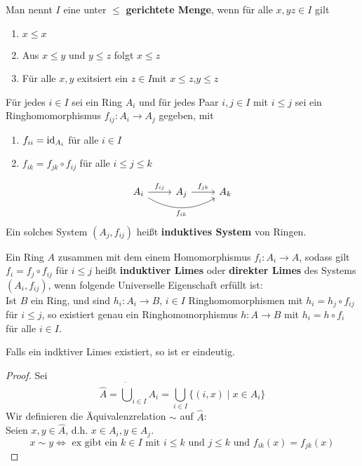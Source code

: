 	\begin{definition}
		Man nennt $I$ eine unter $\leq$ \textbf{gerichtete Menge}, wenn für alle $x,yz\in I$ gilt
		\begin{enumerate}
			\item $x\leq x$
			\item Aus $x\leq y$ und $y\leq z$ folgt $x\leq z$
			\item Für alle $x,y$ exitsiert ein $z\in I$mit $x\leq z$,$y\leq z$
		\end{enumerate}
	\end{definition}

	\begin{definition}
		Für jedes $i\in I$ sei ein Ring $A_i$ und für jedes Paar $i,j\in I$ mit $i\leq j$ sei ein Ringhomomorphismus $f_{ij}:A_i\to A_j$ gegeben, mit
		\begin{enumerate}
			\item $f_{ii}=\operatorname{id}_{A_i}$ für alle $i\in I$
			\item $f_{ik}=f_{jk}\circ f_{ij}$ für alle $i\leq j\leq k$
		\end{enumerate}
		\[\begin{tikzcd}
			A_i\ar[r,"f_{ij}"] \ar[rr,"f_{ik}"',bend right] &A_j\ar[r,"f_{jk}"]&A_k
		\end{tikzcd}\]
		Ein solches System $(A_j,f_{ij})$ heißt \textbf{induktives System} von Ringen.
	\end{definition}

	\begin{definition}
		Ein Ring $A$ zusammen mit dem einem Homomorphismus $f_i:A_i\to A$, sodass gilt $f_i=f_j\circ f_{ij}$ für $i\leq j$ heißt \textbf{induktiver Limes} oder \textbf{direkter Limes} des Systems $(A_i,f_{ij})$, wenn folgende Universelle Eigenschaft erfüllt ist:\\
		Ist $B$ ein Ring, und sind $h_i:A_i\to B$, $i\in I$ Ringhomomorphismen mit $h_i=h_j\circ f_{ij}$ für $i\leq j$, so existiert genau ein Ringhomomorphismus $h:A\to B$ mit $h_i=h\circ f_i$ für alle $i\in I$.
	\end{definition}

	\begin{lem}
		Falls ein indktiver Limes existiert, so ist er eindeutig.
	\end{lem}
	\begin{proof}
		Sei 
		\[\hat A=\dot\bigcup_{i\in I}A_i=\bigcup_{i\in I}\{(i,x)\mid x\in A_i\}\]
		Wir definieren die Äquivalenzrelation $\sim$ auf $\hat A$:\\
		Seien $x,y\in \hat A$, d.h. $x\in A_i,y\in A_j$.
		\[x\sim y\Leftrightarrow \text{ ex gibt ein $k\in I$ mit $i\leq k$ und $j\leq k$ und $f_{ik}(x)=f_{jk}(x)$}\]
	\end{proof}


